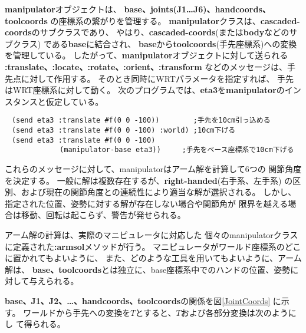 {\bf manipulator}オブジェクトは、
{\bf base、joints(J1\ldots J6)、handcoords、toolcoords}
の座標系の繋がりを管理する。
{\bf manipulator}クラスは、{\bf cascaded-coords}のサブクラスであり、
やはり、{\bf cascaded-coords}(または{\bf body}などのサブクラス)
である{\bf base}に結合され、
{\bf base}から{\bf toolcoords}(手先座標系)への変換を管理している。
したがって、{\bf manipulator}オブジェクトに対して送られる
{\bf :translate、:locate、:rotate、:orient、:transform}
などのメッセージは、手先点に対して作用する。
そのとき同時にWRTパラメータを指定すれば、
手先はWRT座標系に対して動く。
次のプログラムでは、{\bf eta3}を{\bf manipulator}のインスタンスと仮定している。

\begin{verbatim}
　(send eta3 :translate #f(0 0 -100))        ;手先を10cm引っ込める　
　(send eta3 :translate #f(0 0 -100) :world) ;10cm下げる
　(send eta3 :translate #f(0 0 -100)
             (manipulator-base eta3))     ;手先をベース座標系で10cm下げる
\end{verbatim}

これらのメッセージに対して、manipulatorはアーム解を計算して6つの
関節角度を決定する。
一般に解は複数存在するが、{\bf right-handed}(右手系、左手系)
の区別、および現在の関節角度との連続性により適当な解が選択される。
しかし、指定された位置、姿勢に対する解が存在しない場合や関節角が
限界を越える場合は移動、回転は起こらず、警告が発せられる。

アーム解の計算は、実際のマニピュレータに対応した
個々のmanipulatorクラスに定義された{\bf :armsol}メソッドが行う。
マニピュレータがワールド座標系のどこに置かれてもよいように、
また、どのような工具を用いてもよいように、アーム解は、
{\bf base、toolcoords}とは独立に、base座標系中でのハンドの位置、姿勢に
対して与えられる。

{\bf base、J1、J2、\ldots 、handcoords、toolcoords}の関係を図\ref{JointCoords}
に示す。
ワールドから手先への変換を$T$とすると、$T$および各部分変換は次のようにし
て得られる。

